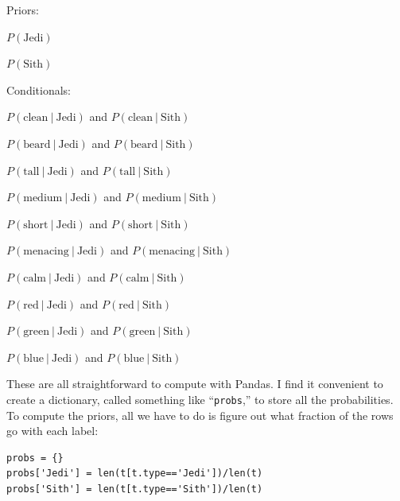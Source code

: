 \begin{compactitem}
\item Priors:
    \begin{compactitem}
    \item $P(\textrm{Jedi})$
    \item $P(\textrm{Sith})$
    \end{compactitem}

\item Conditionals:
    \begin{compactitem}
    \item $P(\textrm{clean}\ |\ \textrm{Jedi})$ and
$P(\textrm{clean}\ |\ \textrm{Sith})$
    \item $P(\textrm{beard}\ |\ \textrm{Jedi})$ and $P(\textrm{beard}\ |\ \textrm{Sith})$
    \item $P(\textrm{tall}\ |\ \textrm{Jedi})$ and $P(\textrm{tall}\ |\ \textrm{Sith})$
    \item $P(\textrm{medium}\ |\ \textrm{Jedi})$ and $P(\textrm{medium}\ |\ \textrm{Sith})$
    \item $P(\textrm{short}\ |\ \textrm{Jedi})$ and $P(\textrm{short}\ |\ \textrm{Sith})$
    \item $P(\textrm{menacing}\ |\ \textrm{Jedi})$ and $P(\textrm{menacing}\ |\ \textrm{Sith})$
    \item $P(\textrm{calm}\ |\ \textrm{Jedi})$ and $P(\textrm{calm}\ |\ \textrm{Sith})$
    \item $P(\textrm{red}\ |\ \textrm{Jedi})$ and $P(\textrm{red}\ |\ \textrm{Sith})$
    \item $P(\textrm{green}\ |\ \textrm{Jedi})$ and $P(\textrm{green}\ |\ \textrm{Sith})$
    \item $P(\textrm{blue}\ |\ \textrm{Jedi})$ and $P(\textrm{blue}\ |\ \textrm{Sith})$
    \end{compactitem}

\end{compactitem}


These are all straightforward to compute with Pandas. I find it convenient to
create a dictionary, called something like ``\texttt{probs},'' to store all the
probabilities. To compute the priors, all we have to do is figure out what
fraction of the rows go with each label:

\label{calcPriors}
\begin{Verbatim}[fontsize=\small,samepage=true,frame=single,framesep=3mm]
probs = {}
probs['Jedi'] = len(t[t.type=='Jedi'])/len(t)
probs['Sith'] = len(t[t.type=='Sith'])/len(t)
\end{Verbatim}

